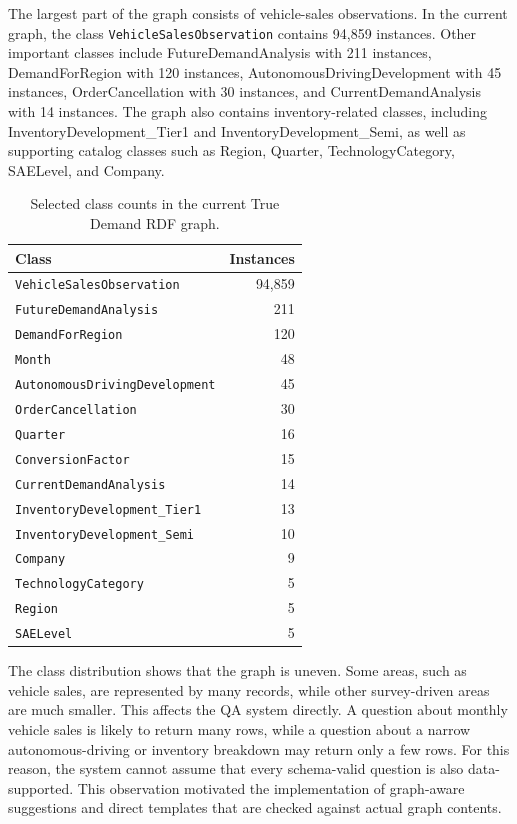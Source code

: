 \documentclass[
  12pt,
  english,
  oneside]{report}
\begin{document}
The largest part of the graph consists of vehicle-sales observations. In the current graph, the class \texttt{VehicleSalesObservation} contains 94,859 instances. Other important classes include FutureDemandAnalysis with 211 instances, DemandForRegion with 120 instances, AutonomousDrivingDevelopment with 45 instances, OrderCancellation with 30 instances, and CurrentDemandAnalysis with 14 instances. The graph also contains inventory-related classes, including InventoryDevelopment\_Tier1 and InventoryDevelopment\_Semi, as well as supporting catalog classes such as Region, Quarter, TechnologyCategory, SAELevel, and Company.

\begin{table}[ht]
\centering
\caption{Selected class counts in the current True Demand RDF graph.}
\label{tab:selected-class-counts}
\begin{tabular}{lr}
\hline
\textbf{Class} & \textbf{Instances} \\
\hline
\texttt{VehicleSalesObservation} & 94,859 \\
\texttt{FutureDemandAnalysis} & 211 \\
\texttt{DemandForRegion} & 120 \\
\texttt{Month} & 48 \\
\texttt{AutonomousDrivingDevelopment} & 45 \\
\texttt{OrderCancellation} & 30 \\
\texttt{Quarter} & 16 \\
\texttt{ConversionFactor} & 15 \\
\texttt{CurrentDemandAnalysis} & 14 \\
\texttt{InventoryDevelopment\_Tier1} & 13 \\
\texttt{InventoryDevelopment\_Semi} & 10 \\
\texttt{Company} & 9 \\
\texttt{TechnologyCategory} & 5 \\
\texttt{Region} & 5 \\
\texttt{SAELevel} & 5 \\
\hline
\end{tabular}
\end{table}

The class distribution shows that the graph is uneven. Some areas, such as vehicle sales, are represented by many records, while other survey-driven areas are much smaller. This affects the QA system directly. A question about monthly vehicle sales is likely to return many rows, while a question about a narrow autonomous-driving or inventory breakdown may return only a few rows. For this reason, the system cannot assume that every schema-valid question is also data-supported. This observation motivated the implementation of graph-aware suggestions and direct templates that are checked against actual graph contents.
\end{document}
